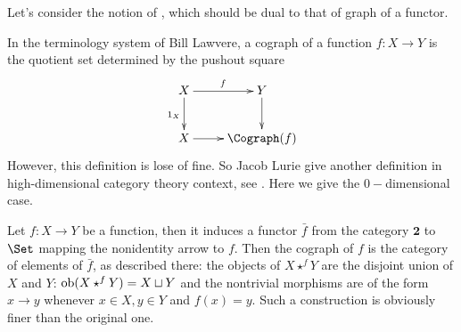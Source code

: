   Let's consider the notion of , which should be dual to that of graph of a functor.

  In the terminology system of Bill Lawvere, a cograph of a function $f\colon X\to Y$ is the quotient set determined by the pushout square
    \begin{displaymath}
      \xymatrix{
        X\ar[r]^{f}\ar[d]_{1_X}&Y\ar[d]\\
        X\ar[r]&\Cograph(f)
        }
    \end{displaymath}
    However, this definition is lose of fine. So Jacob Lurie give another definition in high-dimensional category theory context, see \cite{lurieHTT}. Here we give the $0-$dimensional case.

    Let $f\colon X\to Y$ be a function, then it induces a functor $\bar{f}$ from the category $\mathbf{2}$ to $\Set$ mapping the nonidentity arrow to $f$. Then the cograph of $f$ is the category of elements of $\bar{f}$, as described there: the objects of $X\star^fY$ are the disjoint union of $X$ and $Y$: $\operatorname{ob}(X\star^fY)=X\sqcup Y$ and the nontrivial morphisms are of the form $x\to y$ whenever $x\in X, y\in Y$ and $f(x)=y$. Such a construction is obviously finer than the original one.

